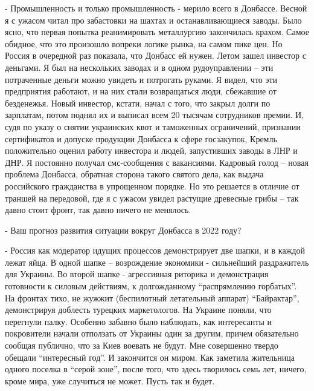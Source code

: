 - Промышленность и только промышленность - мерило всего в Донбассе. Весной я с
ужасом читал про забастовки на шахтах и останавливающиеся заводы. Было ясно,
что первая попытка реанимировать металлургию закончилась крахом. Самое обидное,
что это произошло вопреки логике рынка, на самом пике цен. Но Россия в
очередной раз показала, что Донбасс ей нужен. Летом зашел инвестор с деньгами.
Я был на нескольких заводах и в одном рудоуправлении – эти потраченные деньги
можно увидеть и потрогать руками. Я видел, что эти предприятия работают, и на
них стали возвращаться люди, сбежавшие от безденежья. Новый инвестор, кстати,
начал с того, что закрыл долги по зарплатам, потом поднял их и выписал всем 20
тысячам сотрудников премии. И, судя по указу о снятии украинских квот и
таможенных ограничений, признании сертификатов и допуске продукции Донбасса к
сфере госзакупок, Кремль положительно оценил работу инвестора и людей,
запустивших заводы в ЛНР и ДНР. Я постоянно получал смс-сообщения с вакансиями.
Кадровый голод – новая проблема Донбасса, обратная сторона такого святого дела,
как выдача российского гражданства в упрощенном порядке. Но это решается в
отличие от траншей на передовой, где я с ужасом увидел растущие древесные грибы
– так давно стоит фронт, так давно ничего не менялось.

- Ваш прогноз развития ситуации вокруг Донбасса в 2022 году?

- Россия как модератор идущих процессов демонстрирует две шапки, и в каждой
лежат яйца. В одной шапке – возрождение экономики - сильнейший раздражитель для
Украины. Во второй шапке - агрессивная риторика и демонстрация готовности к
силовым действиям, к долгожданному \enquote{распрямлению горбатых}. На фронтах
тихо, не жужжит (беспилотный летательный аппарат) \enquote{Байрактар},
демонстрируя доблесть турецких маркетологов. На Украине поняли, что перегнули
палку. Особенно забавно было наблюдать, как интересанты и покровители начали
отползать от Украины один за другим, причем обязательно сообщая публично, что
за Киев воевать не будут.  Мне совершенно твердо обещали \enquote{интересный
год}. И закончится он миром. Как заметила жительница одного поселка в
\enquote{серой зоне}, после того, что здесь творилось семь лет, ничего, кроме
мира, уже случиться не может. Пусть так и будет.
